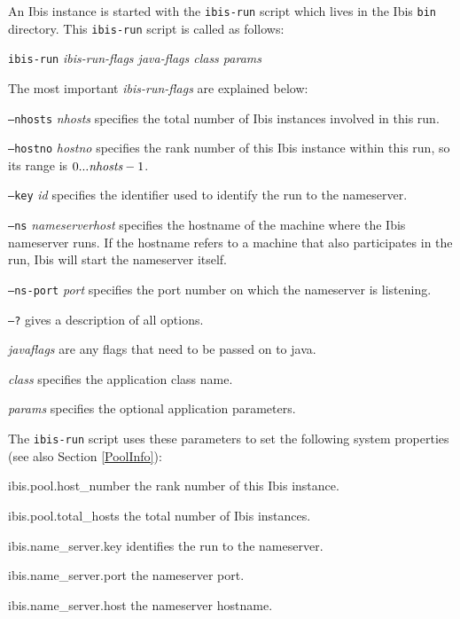 \documentclass[10pt]{article}
\begin{document}
An Ibis instance is started with the \texttt{ibis-run} script which
lives in the Ibis \texttt{bin} directory.  This \texttt{ibis-run}
script is called as follows:
\begin{center}
\texttt{ibis-run} \emph{ibis-run-flags java-flags class params}
\end{center}
The most important \emph{ibis-run-flags} are explained below:
\begin{description}
\item{\texttt{--nhosts} \emph{nhosts}}
specifies the total number of Ibis instances involved in this run.
\item{\texttt{--hostno} \emph{hostno}}
specifies the rank number of this Ibis instance within this run,
so its range is $0 ... \emph{nhosts}-1$.
\item{\texttt{--key} \emph{id}}
specifies the identifier used to identify the run to the nameserver.
\item{\texttt{--ns} \emph{nameserverhost}}
specifies the hostname of the machine where the Ibis nameserver runs.
If the hostname refers to a machine that also participates in the run,
Ibis will start the nameserver itself.
\item{\texttt{--ns-port} \emph{port}}
specifies the port number on which the nameserver is listening.
\item{\texttt{--?}}
gives a description of all options.
\item{\emph{javaflags}}
are any flags that need to be passed on to java.
\item{\emph{class}}
specifies the application class name.
\item{\emph{params}}
specifies the optional application parameters.
\end{description}

The \texttt{ibis-run} script uses these parameters to set the following
system properties (see also Section \ref{PoolInfo}):
\begin{description}
\item{ibis.pool.host\_number}
the rank number of this Ibis instance.
\item{ibis.pool.total\_hosts}
the total number of Ibis instances.
\item{ibis.name\_server.key}
identifies the run to the nameserver.
\item{ibis.name\_server.port}
the nameserver port.
\item{ibis.name\_server.host}
the nameserver hostname.
\end{description}
\end{document}
